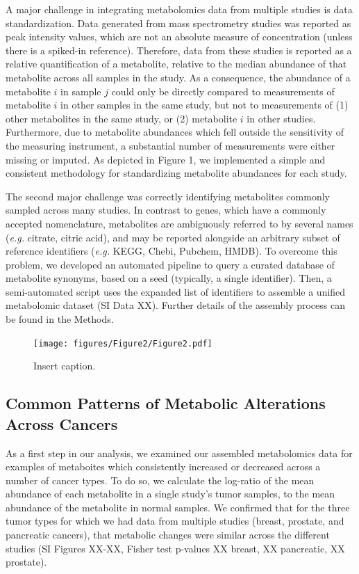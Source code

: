 \documentclass[10pt]{article}
\begin{document}
A major challenge in integrating metabolomics data from multiple studies is data standardization. Data generated from mass spectrometry studies was reported as peak intensity values, which are not an absolute measure of concentration (unless there is a spiked-in reference). Therefore, data from these studies is reported as a relative quantification of a metabolite, relative to the median abundance of that metabolite across all samples in the study. As a consequence, the abundance of a metabolite $i$ in sample $j$ could only be directly compared to measurements of metabolite $i$ in other samples in the same study, but not to measurements of  (1) other metabolites in the same study, or (2) metabolite $i$ in other studies. Furthermore, due to metabolite abundances which fell outside the sensitivity of the measuring instrument, a substantial number of measurements were either missing or imputed. As depicted in Figure 1, we implemented a simple and consistent methodology for standardizing metabolite abundances for each study. 

The second major challenge was correctly identifying metabolites commonly sampled across many studies. In contrast to genes, which have a commonly accepted nomenclature, metabolites are ambiguously referred to by several names (\textit{e.g.} citrate, citric acid), and may be reported alongside an arbitrary subset of reference identifiers (\textit{e.g.} KEGG, Chebi, Pubchem, HMDB). To overcome this problem, we developed an automated pipeline to query a curated database of metabolite synonyms, based on a seed (typically, a single identifier). Then, a semi-automated script uses the expanded list of identifiers to assemble a unified metabolomic dataset (SI Data XX). Further details of the assembly process can be found in the Methods.

\begin{figure}[ht!]
  \centering
     \texttt{[image: figures/Figure2/Figure2.pdf]}
  \caption{Insert caption. }
     \label{fig:Fig2}
\end{figure}

\subsection{ Common Patterns of Metabolic Alterations Across Cancers}

As a first step in our analysis, we examined our assembled metabolomics data for examples of metaboites which consistently increased or decreased across a number of cancer types. To do so, we calculate the log-ratio of the mean abundance of each metabolite in a single study's tumor samples, to the mean abundance of the metabolite in normal samples. We confirmed that for the three tumor types for which we had data from multiple studies (breast, prostate, and pancreatic cancers), that metabolic changes were similar across the different studies (SI Figures XX-XX, Fisher test p-values XX breast, XX pancreatic, XX prostate).
\end{document}
